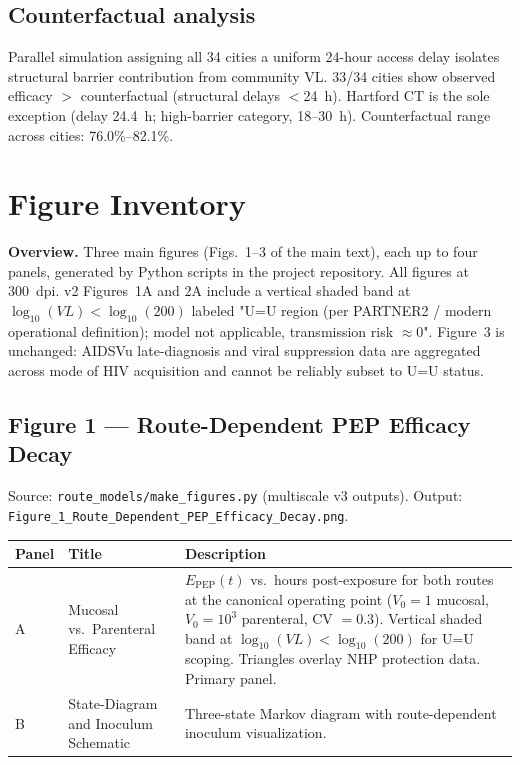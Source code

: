 \documentclass[11pt]{article}
\theoremstyle{definition}
\theoremstyle{remark}
\newcommand{\Epep}{E_{\text{PEP}}}
\begin{document}
\subsection{Counterfactual analysis}

Parallel simulation assigning all 34 cities a uniform 24-hour access delay isolates structural barrier contribution from community VL. 33/34 cities show observed efficacy $>$ counterfactual (structural delays $<$24~h). Hartford CT is the sole exception (delay 24.4~h; high-barrier category, 18--30~h). Counterfactual range across cities: 76.0\%--82.1\%.

\section{Figure Inventory}

\textbf{Overview.} Three main figures (Figs.~1--3 of the main text), each up to four panels, generated by Python scripts in the project repository. All figures at 300~dpi. v2 Figures~1A and 2A include a vertical shaded band at $\log_{10}(V\!L) < \log_{10}(200)$ labeled "U=U region (per PARTNER2 / modern operational definition); model not applicable, transmission risk $\approx 0$". Figure~3 is unchanged: AIDSVu late-diagnosis and viral suppression data are aggregated across mode of HIV acquisition and cannot be reliably subset to U=U status.

\subsection{Figure 1 --- Route-Dependent PEP Efficacy Decay}

Source: \texttt{route\_models/make\_figures.py} (multiscale v3 outputs). Output: \texttt{Figure\_1\_Route\_Dependent\_PEP\_Efficacy\_Decay.png}.

\begin{table}[H]
\centering
\small
\begin{tabular}{@{}lp{4cm}p{8cm}@{}}
\toprule
\textbf{Panel} & \textbf{Title} & \textbf{Description} \\
\midrule
A & Mucosal vs.\ Parenteral Efficacy & $\Epep(t)$ vs.\ hours post-exposure for both routes at the canonical operating point ($V_{0} = 1$ mucosal, $V_{0} = 10^{3}$ parenteral, CV $= 0.3$). Vertical shaded band at $\log_{10}(V\!L) < \log_{10}(200)$ for U=U scoping. Triangles overlay NHP protection data. Primary panel. \\
B & State-Diagram and Inoculum Schematic & Three-state Markov diagram with route-dependent inoculum visualization. \\
\bottomrule
\end{tabular}
\end{table}
\end{document}
